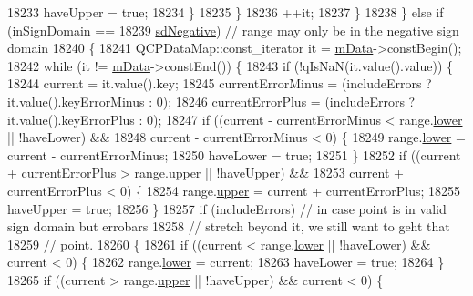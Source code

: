 \begin{DoxyCode}
18233           haveUpper = \textcolor{keyword}{true};
18234         \}
18235       \}
18236       ++it;
18237     \}
18238   \} \textcolor{keywordflow}{else} \textcolor{keywordflow}{if} (inSignDomain ==
18239              \hyperlink{class_q_c_p_abstract_plottable_a661743478a1d3c09d28ec2711d7653d8a0fc9a70796ef60ad18ddd18056e6dc63}{sdNegative}) \textcolor{comment}{// range may only be in the negative sign domain}
18240   \{
18241     QCPDataMap::const\_iterator it = \hyperlink{class_q_c_p_graph_a8457c840f69a0ac49f61d30a509c5d08}{mData}->constBegin();
18242     \textcolor{keywordflow}{while} (it != \hyperlink{class_q_c_p_graph_a8457c840f69a0ac49f61d30a509c5d08}{mData}->constEnd()) \{
18243       \textcolor{keywordflow}{if} (!qIsNaN(it.value().value)) \{
18244         current = it.value().key;
18245         currentErrorMinus = (includeErrors ? it.value().keyErrorMinus : 0);
18246         currentErrorPlus = (includeErrors ? it.value().keyErrorPlus : 0);
18247         \textcolor{keywordflow}{if} ((current - currentErrorMinus < range.\hyperlink{class_q_c_p_range_aa3aca3edb14f7ca0c85d912647b91745}{lower} || !haveLower) &&
18248             current - currentErrorMinus < 0) \{
18249           range.\hyperlink{class_q_c_p_range_aa3aca3edb14f7ca0c85d912647b91745}{lower} = current - currentErrorMinus;
18250           haveLower = \textcolor{keyword}{true};
18251         \}
18252         \textcolor{keywordflow}{if} ((current + currentErrorPlus > range.\hyperlink{class_q_c_p_range_ae44eb3aafe1d0e2ed34b499b6d2e074f}{upper} || !haveUpper) &&
18253             current + currentErrorPlus < 0) \{
18254           range.\hyperlink{class_q_c_p_range_ae44eb3aafe1d0e2ed34b499b6d2e074f}{upper} = current + currentErrorPlus;
18255           haveUpper = \textcolor{keyword}{true};
18256         \}
18257         \textcolor{keywordflow}{if} (includeErrors) \textcolor{comment}{// in case point is in valid sign domain but errobars}
18258                            \textcolor{comment}{// stretch beyond it, we still want to geht that}
18259                            \textcolor{comment}{// point.}
18260         \{
18261           \textcolor{keywordflow}{if} ((current < range.\hyperlink{class_q_c_p_range_aa3aca3edb14f7ca0c85d912647b91745}{lower} || !haveLower) && current < 0) \{
18262             range.\hyperlink{class_q_c_p_range_aa3aca3edb14f7ca0c85d912647b91745}{lower} = current;
18263             haveLower = \textcolor{keyword}{true};
18264           \}
18265           \textcolor{keywordflow}{if} ((current > range.\hyperlink{class_q_c_p_range_ae44eb3aafe1d0e2ed34b499b6d2e074f}{upper} || !haveUpper) && current < 0) \{

\end{DoxyCode}
